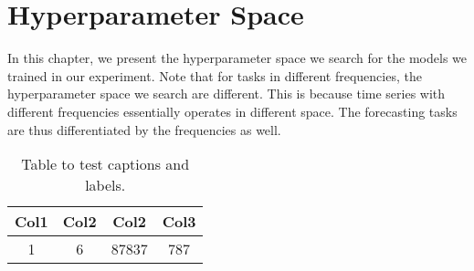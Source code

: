\chapter{Hyperparameter Space}\label{apdx: hyper space}
In this chapter, we present the hyperparameter space we search for the models we trained in our experiment. Note that for tasks in different frequencies, the hyperparameter space we search are different. This is because time series with different frequencies essentially operates in different space. The forecasting tasks are thus differentiated by the frequencies as well.

\begin{center}
    \begin{table}
        \begin{tabular}{|c c c c|} 
            \hline
            Col1 & Col2 & Col2 & Col3 \\
            \hline\hline
            1 & 6 & 87837 & 787 \\ 
            \hline
        \end{tabular}
        \caption{Table to test captions and labels.}
        \label{tbl: hyper space}
    \end{table}
\end{center}
